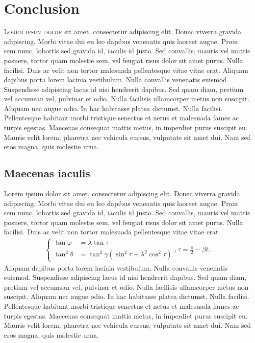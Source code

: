 \chapter{Conclusion}
\lettrine[lines=4, loversize=-0.1, lraise=0.1]{L}{orem ipsum dolor} sit amet, consectetur adipiscing elit. Donec viverra gravida adipiscing. Morbi vitae dui eu leo dapibus venenatis quis laoreet augue. Proin sem nunc, lobortis sed gravida id, iaculis id justo. Sed convallis, mauris vel mattis posuere, tortor quam molestie sem, vel feugiat risus dolor sit amet purus. Nulla facilisi. Duis ac velit non tortor malesuada pellentesque vitae vitae erat. Aliquam dapibus porta lorem lacinia vestibulum. Nulla convallis venenatis euismod. Suspendisse adipiscing lacus id nisi hendrerit dapibus. Sed quam diam, pretium vel accumsan vel, pulvinar et odio. Nulla facilisis ullamcorper metus non suscipit. Aliquam nec augue odio. In hac habitasse platea dictumst. Nulla facilisi. Pellentesque habitant morbi tristique senectus et netus et malesuada fames ac turpis egestas. Maecenas consequat mattis metus, in imperdiet purus suscipit eu. Mauris velit lorem, pharetra nec vehicula cursus, vulputate sit amet dui. Nam sed eros magna, quis molestie urna.
\section{Maecenas iaculis}
Lorem ipsum dolor sit amet, consectetur adipiscing elit. Donec viverra gravida adipiscing. Morbi vitae dui eu leo dapibus venenatis quis laoreet augue. Proin sem nunc, lobortis sed gravida id, iaculis id justo. Sed convallis, mauris vel mattis posuere, tortor quam molestie sem, vel feugiat risus dolor sit amet purus. Nulla facilisi. Duis ac velit non tortor malesuada pellentesque vitae vitae erat
\begin{gather*}
\left\{\begin{split}
\tan \varphi &= \lambda \tan \tau \\
\tan^2 \theta &= \tan^2 \gamma (\sin^2\tau + \lambda^2 \cos^2\tau)
\end{split}\right., \tau = \frac{\pi}{2}-\beta t.
\end{gather*}
Aliquam dapibus porta lorem lacinia vestibulum. Nulla convallis venenatis euismod. Suspendisse adipiscing lacus id nisi hendrerit dapibus. Sed quam diam, pretium vel accumsan vel, pulvinar et odio. Nulla facilisis ullamcorper metus non suscipit. Aliquam nec augue odio. In hac habitasse platea dictumst. Nulla facilisi. Pellentesque habitant morbi tristique senectus et netus et malesuada fames ac turpis egestas. Maecenas consequat mattis metus, in imperdiet purus suscipit eu. Mauris velit lorem, pharetra nec vehicula cursus, vulputate sit amet dui. Nam sed eros magna, quis molestie urna.

